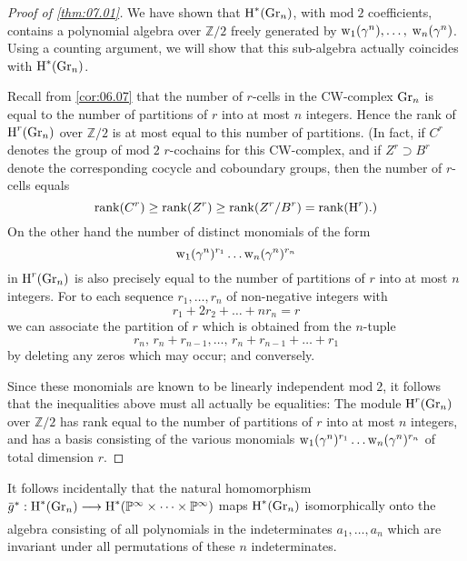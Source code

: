 \documentclass[../main]{subfiles}
\begin{document}
\begin{proof}[Proof of \ref{thm:07.01}]
We have shown that $\operatorname{H}^{\ast}(\operatorname{Gr}_n)$, with $\mathrm{mod}\; 2$ coefficients, contains a polynomial algebra over $\mathbb{Z} / 2$ freely generated by $\operatorname{w}_{1}(\gamma^{n}), \dots,$ $\operatorname{w}_{n}(\gamma^{n})$. Using a counting argument, we will show that this sub-algebra actually coincides with $\operatorname{H}^{\ast}(\operatorname{Gr}_n)$.
	
Recall from \ref{cor:06.07} that the number of $r$-cells in the CW-complex $\operatorname{Gr}_n$ is equal to the number of partitions of $r$ into at most $n$ integers. Hence the rank of $\operatorname{H}^{r}(\operatorname{Gr}_n)$ over $\mathbb{Z} / 2$ is at most equal to this number of partitions. (In fact, if $C^{r}$ denotes the group of $\mathrm{mod}\; 2$ $r$-cochains for this CW-complex, and if $Z^{r} \supset B^{r}$ denote the corresponding cocycle and coboundary groups, then the number of $r$-cells equals
\[
\operatorname{rank}(C^{r}) \geq \operatorname{rank}(Z^{r}) \geq \operatorname{rank}(Z^{r} / B^{r})=\operatorname{rank}(\operatorname{H}^{r}) \text{.)}
\]
On the other hand the number of distinct monomials of the form
\[\operatorname{w}_{1}(\gamma^{n})^{r_{1}} \dots \operatorname{w}_{n}(\gamma^{n})^{r_n}\]
in $\operatorname{H}^{r}(\operatorname{Gr}_n)$ is also precisely equal to the number of partitions of $r$ into at most $n$ integers. For to each sequence $r_{1}, \dots, r_{n}$ of non-negative integers with
\[
r_{1}+2 r_{2}+\dots+nr_{n}=r
\]
we can associate the partition of $r$ which is obtained from the $n$-tuple
\[
r_{n},\, r_{n}+r_{n-1}, \dots,\, r_{n}+r_{n-1}+\dots+r_{1}
\]
by deleting any zeros which may occur; and conversely.
	
Since these monomials are known to be linearly independent $\mathrm{mod}\; 2$, it follows that the inequalities above must all actually be equalities: The module $\operatorname{H}^{r}(\operatorname{Gr}_n)$ over $\mathbb{Z} / 2$ has rank equal to the number of partitions of $r$ into at most $n$ integers, and has a basis consisting of the various monomials $\operatorname{w}_{1}(\gamma^{n})^{r_{1}} \dots \operatorname{w}_{n}(\gamma^{n})^{r_{n}}$ of total dimension $r$.
\end{proof} 
It follows incidentally that the natural homomorphism\newline  $\xoverline{g}^\ast : \homology^\ast(\grassmannian_n)\varrightarrow{} \homology^\ast(\projective^\infty\times\dots\times\projective^\infty)$ maps $\operatorname{H}^\ast(\operatorname{Gr}_n)$ isomorphically onto the algebra consisting of all polynomials in the indeterminates $a_1, \dots, a_n$ which are invariant under all permutations of these $n$ indeterminates.
\end{document}
